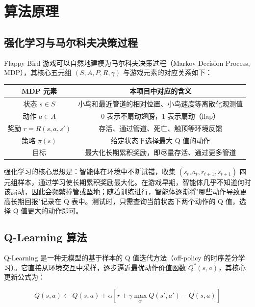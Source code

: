 \documentclass[12pt]{article}
\begin{document}
\section{算法原理}

\subsection{强化学习与马尔科夫决策过程}

Flappy Bird 游戏可以自然地建模为马尔科夫决策过程（Markov Decision Process, MDP），其核心五元组 $(S, A, P, R, \gamma)$ 与游戏元素的对应关系如下：

\begin{table}[H]
	\centering
	\begin{tabular}{cc}
		\toprule
		MDP 元素 & 本项目中对应的含义 \\
		\midrule
		状态 $s \in S$ & 小鸟和最近管道的相对位置、小鸟速度等离散化观测值 \\
		动作 $a \in A$ & $0$ 表示不扇动翅膀，$1$ 表示扇动（flap） \\
		奖励 $r = R(s, a, s')$ & 存活、通过管道、死亡、触顶等环境反馈 \\
		策略 $\pi(s)$ & 给定状态下选择最大 Q 值的动作 \\
		目标 & 最大化长期累积奖励，即尽量存活、通过更多管道 \\
		\bottomrule
	\end{tabular}
\end{table}

强化学习的核心思想是：智能体在环境中不断试错，收集 $(s_t, a_t, r_{t+1}, s_{t+1})$ 四元组样本，通过学习使长期累积奖励最大化。在游戏早期，智能体几乎不知道何时该扇动，因此会频繁撞管或坠地；随着训练进行，智能体逐渐将"哪些动作导致更高长期回报"记录在 Q 表中。测试时，只需查询当前状态下两个动作的 Q 值，选择 Q 值更大的动作即可。

\subsection{Q-Learning 算法}

Q-Learning 是一种无模型的基于样本的 Q 值迭代方法（off-policy 的时序差分学习）。它直接从环境交互中采样，逐步逼近最优动作价值函数 $Q^*(s, a)$，其核心更新公式为：

\begin{equation}
	Q(s, a) \leftarrow Q(s, a) + \alpha \left[ r + \gamma \max_{a'} Q(s', a') - Q(s, a) \right]
	\label{eq:q_learning}
\end{equation}
\end{document}
